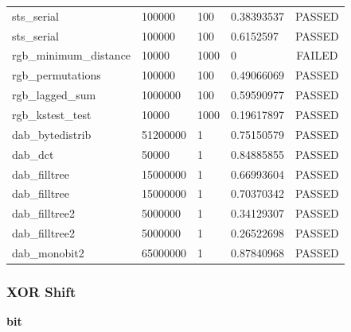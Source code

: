 \documentclass[titlepage, 11pt]{article}
\begin{document}
\begin{table}[!htb]
\begin{tabular}{l|l|l|l|c}
sts\_serial & 100000 & 100 & 0.38393537 & PASSED \\
sts\_serial & 100000 & 100 & 0.6152597 & PASSED \\
rgb\_minimum\_distance & 10000 & 1000 & 0 & FAILED \\
rgb\_permutations & 100000 & 100 & 0.49066069 & PASSED \\
rgb\_lagged\_sum & 1000000 & 100 & 0.59590977 & PASSED \\
rgb\_kstest\_test & 10000 & 1000 & 0.19617897 & PASSED \\
dab\_bytedistrib & 51200000 & 1 & 0.75150579 & PASSED \\
dab\_dct & 50000 & 1 & 0.84885855 & PASSED \\
dab\_filltree & 15000000 & 1 & 0.66993604 & PASSED \\
dab\_filltree & 15000000 & 1 & 0.70370342 & PASSED \\
dab\_filltree2 & 5000000 & 1 & 0.34129307 & PASSED \\
dab\_filltree2 & 5000000 & 1 & 0.26522698 & PASSED \\
dab\_monobit2 & 65000000 & 1 & 0.87840968 & PASSED
\end{tabular}
\end{table}


\newpage
\subsubsection{XOR Shift}
\textbf{ bit}
\end{document}
